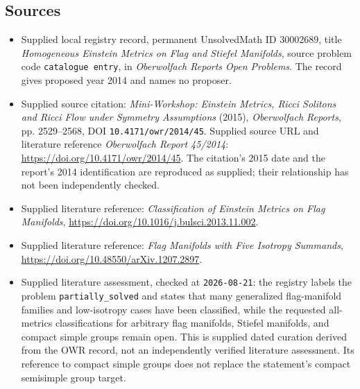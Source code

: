 \documentclass[11pt]{article}
\begin{document}
\subsection{Sources}
\begin{itemize}
\item Supplied local registry record, permanent UnsolvedMath ID \(30002689\), title \emph{Homogeneous Einstein Metrics on Flag and Stiefel Manifolds}, source problem code \texttt{catalogue entry}, in \emph{Oberwolfach Reports Open Problems}. The record gives proposed year 2014 and names no proposer.
\item Supplied source citation: \emph{Mini-Workshop: Einstein Metrics, Ricci Solitons and Ricci Flow under Symmetry Assumptions} (2015), \emph{Oberwolfach Reports}, pp. 2529--2568, DOI \texttt{10.4171/owr/2014/45}. Supplied source URL and literature reference \emph{Oberwolfach Report 45/2014}: \url{https://doi.org/10.4171/owr/2014/45}. The citation's 2015 date and the report's 2014 identification are reproduced as supplied; their relationship has not been independently checked.
\item Supplied literature reference: \emph{Classification of Einstein Metrics on Flag Manifolds}, \url{https://doi.org/10.1016/j.bulsci.2013.11.002}.
\item Supplied literature reference: \emph{Flag Manifolds with Five Isotropy Summands}, \url{https://doi.org/10.48550/arXiv.1207.2897}.
\item Supplied literature assessment, checked at \texttt{2026-08-21}: the registry labels the problem \texttt{partially\_solved} and states that many generalized flag-manifold families and low-isotropy cases have been classified, while the requested all-metrics classifications for arbitrary flag manifolds, Stiefel manifolds, and compact simple groups remain open. This is supplied dated curation derived from the OWR record, not an independently verified literature assessment. Its reference to compact simple groups does not replace the statement's compact semisimple group target.
\end{itemize}
\end{document}
